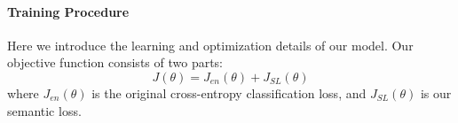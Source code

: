 
\fi


\paragraph{Training Procedure}
Here we introduce the learning and optimization details of our model. Our objective function consists of two parts:
\begin{equation}
	J(\theta) = J_{en}(\theta) + J_{SL}(\theta)
\end{equation}
where  $J_{en}(\theta)$ is the original cross-entropy classification loss, and $J_{SL}(\theta)$ is our semantic loss.


